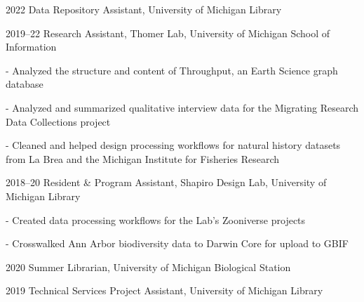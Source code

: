 \documentclass[12pt,letterpaper]{report}
\newcommand{\listitemspace}{0.25em}
\renewenvironment{itemize}
{\begin{list}{}{\setlength{\leftmargin}{0em}
            \setlength{\parskip}{0em}
            \setlength{\itemsep}{\listitemspace}
            \setlength{\parsep}{\listitemspace}}}
{\end{list}}
\begin{document}
\begin{tablist}

	\item[2022] \tab Data Repository Assistant, University of Michigan Library
    
	\item[2019--22] \tab Research Assistant, Thomer Lab, University of Michigan School of Information

	\begin{itemize} \begin{footnotesize}

		\item - Analyzed the structure and content of Throughput, an Earth Science graph database
		
		\item - Analyzed and summarized qualitative interview data for the Migrating Research Data Collections project

		\item - Cleaned and helped design processing workflows for natural history datasets from La Brea and the Michigan Institute for Fisheries Research

	\end{footnotesize} \end{itemize}
        
	\item[2018--20] \tab Resident \& Program Assistant, Shapiro Design Lab, University of Michigan Library

	\begin{itemize} \begin{footnotesize}

		\item - Created data processing workflows for the Lab’s Zooniverse projects 

		\item - Crosswalked Ann Arbor biodiversity data to Darwin Core for upload to GBIF

	\end{footnotesize} \end{itemize}

	\item[2020] \tab Summer Librarian, University of Michigan Biological Station
    
	\item[2019] \tab Technical Services Project Assistant, University of Michigan Library
	
	\begin{itemize} \begin{footnotesize}
	

\end{footnotesize}
\end{itemize}
\end{tablist}
\end{document}
